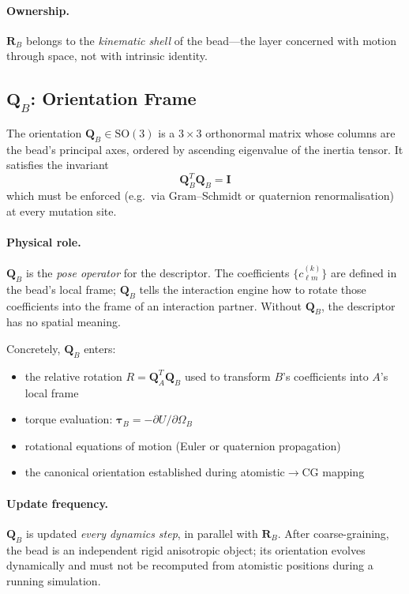 \documentclass[11pt]{article}
\begin{document}
\paragraph{Ownership.}
$\mathbf{R}_B$ belongs to the \emph{kinematic shell} of the bead---the
layer concerned with motion through space, not with intrinsic identity.

\subsection{$\mathbf{Q}_B$: Orientation Frame}

The orientation $\mathbf{Q}_B \in \mathrm{SO}(3)$ is a $3\times 3$
orthonormal matrix whose columns are the bead's principal axes, ordered by
ascending eigenvalue of the inertia tensor.  It satisfies the invariant
\begin{equation}
    \mathbf{Q}_B^T \mathbf{Q}_B = \mathbf{I}
\end{equation}
which must be enforced (e.g.\ via Gram--Schmidt or quaternion
renormalisation) at every mutation site.

\paragraph{Physical role.}
$\mathbf{Q}_B$ is the \emph{pose operator} for the descriptor.
The coefficients $\{c_{\ell m}^{(k)}\}$ are defined in the bead's local
frame; $\mathbf{Q}_B$ tells the interaction engine how to rotate those
coefficients into the frame of an interaction partner.  Without
$\mathbf{Q}_B$, the descriptor has no spatial meaning.

Concretely, $\mathbf{Q}_B$ enters:
\begin{itemize}
    \item the relative rotation $R = \mathbf{Q}_A^T \mathbf{Q}_B$ used to
          transform $B$'s coefficients into $A$'s local frame
    \item torque evaluation:
          $\boldsymbol{\tau}_B = -\partial U / \partial \Omega_B$
    \item rotational equations of motion (Euler or quaternion propagation)
    \item the canonical orientation established during atomistic$\to$CG mapping
\end{itemize}

\paragraph{Update frequency.}
$\mathbf{Q}_B$ is updated \emph{every dynamics step}, in parallel with
$\mathbf{R}_B$.  After coarse-graining, the bead is an independent rigid
anisotropic object; its orientation evolves dynamically and must not be
recomputed from atomistic positions during a running simulation.
\end{document}
